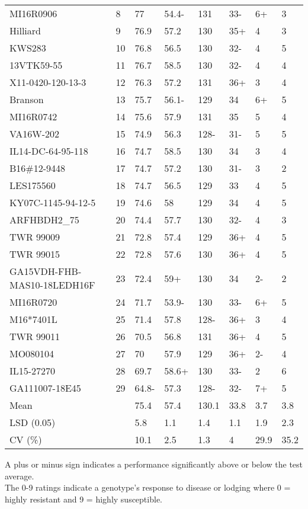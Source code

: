 \documentclass[12pt, letterpaper]{article}
\begin{document}
\begin{landscape}
\begin{table}
\begin{tabular}{llllllll}
  MI16R0906 &  8 & 77 & 54.4- & 131 & 33- & 6+ & 3 \\ 
  Hilliard &  9 & 76.9 & 57.2 & 130 & 35+ & 4 & 3 \\ 
  KWS283 & 10 & 76.8 & 56.5 & 130 & 32- & 4 & 5 \\ 
  13VTK59-55 & 11 & 76.7 & 58.5 & 130 & 32- & 4 & 4 \\ 
  X11-0420-120-13-3 & 12 & 76.3 & 57.2 & 131 & 36+ & 3 & 4 \\ 
  Branson & 13 & 75.7 & 56.1- & 129 & 34 & 6+ & 5 \\ 
  MI16R0742 & 14 & 75.6 & 57.9 & 131 & 35 & 5 & 4 \\ 
  VA16W-202 & 15 & 74.9 & 56.3 & 128- & 31- & 5 & 5 \\ 
  IL14-DC-64-95-118 & 16 & 74.7 & 58.5 & 130 & 34 & 3 & 4 \\ 
  B16\#12-9448 & 17 & 74.7 & 57.2 & 130 & 31- & 3 & 2 \\ 
  LES175560 & 18 & 74.7 & 56.5 & 129 & 33 & 4 & 5 \\ 
  KY07C-1145-94-12-5 & 19 & 74.6 & 58 & 129 & 34 & 4 & 5 \\ 
  ARFHBDH2\_75 & 20 & 74.4 & 57.7 & 130 & 32- & 4 & 3 \\ 
  TWR 99009 & 21 & 72.8 & 57.4 & 129 & 36+ & 4 & 5 \\ 
  TWR 99015 & 22 & 72.8 & 57.6 & 130 & 36+ & 4 & 5 \\ 
  GA15VDH-FHB-MAS10-18LEDH16F & 23 & 72.4 & 59+ & 130 & 34 & 2- & 2 \\ 
  MI16R0720 & 24 & 71.7 & 53.9- & 130 & 33- & 6+ & 5 \\ 
  M16*7401L & 25 & 71.4 & 57.8 & 128- & 36+ & 3 & 4 \\ 
  TWR 99011 & 26 & 70.5 & 56.8 & 131 & 36+ & 4 & 5 \\ 
  MO080104 & 27 & 70 & 57.9 & 129 & 36+ & 2- & 4 \\ 
  IL15-27270 & 28 & 69.7 & 58.6+ & 130 & 33- & 2 & 6 \\ 
  GA111007-18E45 & 29 & 64.8- & 57.3 & 128- & 32- & 7+ & 5 \\ 
  \midrule
  Mean &  & 75.4 & 57.4 & 130.1 & 33.8 & 3.7 & 3.8 \\ 
  LSD (0.05) &  & 5.8 & 1.1 & 1.4 & 1.1 & 1.9 & 2.3 \\ 
  CV (\%) &  & 10.1 & 2.5 & 1.3 & 4 & 29.9 & 35.2 \\ 
   \bottomrule
\end{tabular}

\raggedright{
\footnotesize
A plus or minus sign indicates a performance significantly above or below the test average.\\
The 0-9 ratings indicate a genotype's response to disease or lodging where 0 = highly resistant and 9 = highly susceptible.
}
\end{table}


\end{landscape}
\end{document}
